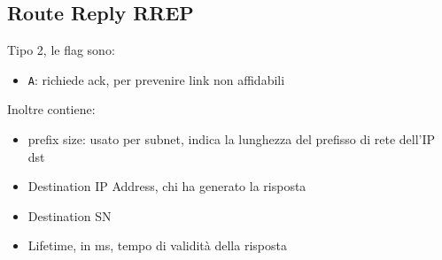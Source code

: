 \subsection{Route Reply RREP}

Tipo 2, le flag sono:
\begin{itemize}
    \item \texttt{A}: richiede ack, per prevenire link non affidabili
\end{itemize}

Inoltre contiene:
\begin{itemize}
    \item prefix size: usato per subnet, indica la lunghezza del prefisso di rete dell'IP dst
    
    \item Destination IP Address, chi ha generato la risposta
    
    \item Destination SN
    
    \item Lifetime, in ms, tempo di validità della risposta
\end{itemize}

